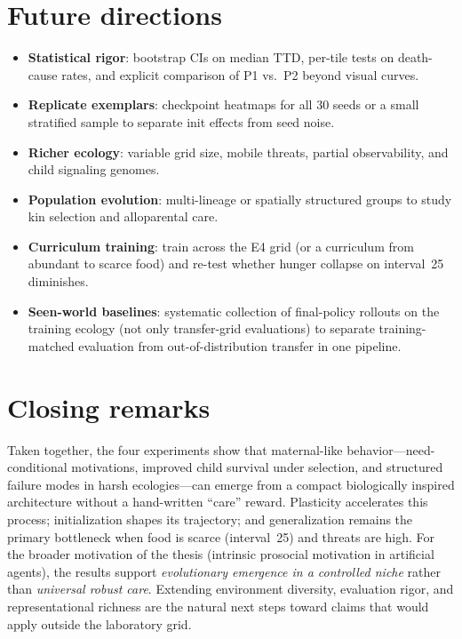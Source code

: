 \section{Future directions}

\begin{itemize}
    \item \textbf{Statistical rigor}: bootstrap CIs on median TTD, per-tile tests on death-cause rates, and explicit comparison of P1 vs.\ P2 beyond visual curves.
    \item \textbf{Replicate exemplars}: checkpoint heatmaps for all 30 seeds or a small stratified sample to separate init effects from seed noise.
    \item \textbf{Richer ecology}: variable grid size, mobile threats, partial observability, and child signaling genomes.
    \item \textbf{Population evolution}: multi-lineage or spatially structured groups to study kin selection and alloparental care.
    \item \textbf{Curriculum training}: train across the E4 grid (or a curriculum from abundant to scarce food) and re-test whether hunger collapse on interval~25 diminishes.
    \item \textbf{Seen-world baselines}: systematic collection of final-policy rollouts on the training ecology (not only transfer-grid evaluations) to separate training-matched evaluation from out-of-distribution transfer in one pipeline.
\end{itemize}

\section{Closing remarks}

Taken together, the four experiments show that maternal-like behavior---need-conditional motivations, improved child survival under selection, and structured failure modes in harsh ecologies---can emerge from a compact biologically inspired architecture without a hand-written ``care'' reward.
Plasticity accelerates this process; initialization shapes its trajectory; and generalization remains the primary bottleneck when food is scarce (interval~25) and threats are high.
For the broader motivation of the thesis (intrinsic prosocial motivation in artificial agents), the results support \emph{evolutionary emergence in a controlled niche} rather than \emph{universal robust care}.
Extending environment diversity, evaluation rigor, and representational richness are the natural next steps toward claims that would apply outside the laboratory grid.
